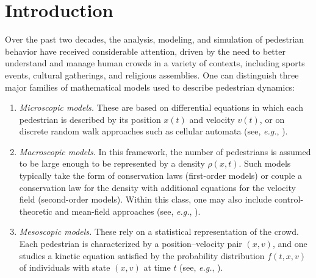\documentclass[final,reqno]{amsart}
\theoremstyle{plain}
\theoremstyle{definition}
\theoremstyle{remark}
\numberwithin{remark}{section}	%
\numberwithin{example}{section}	%
\begin{document}

\allowdisplaybreaks	%
\acresetall	%

\maketitle

\setcounter{tocdepth}{1}


\section{Introduction}\label{sec:intro}
Over the past two decades, the analysis, modeling, and simulation of pedestrian behavior have received considerable attention, driven by the need to better understand and manage human crowds in a variety of contexts, including sports events, cultural gatherings, and religious assemblies. One can distinguish three major families of mathematical models used to describe pedestrian dynamics:

\begin{enumerate}

\item {\textit{Microscopic models.}} These are based on differential equations in which each pedestrian is described by its position $x(t)$ and velocity $v(t)$, or on discrete random walk approaches such as cellular automata (see, \textit{e.g.}, \cite{Maury&Venel, maury2007modele, blue2000modeling, blue1998emergent, BURSTEDDE2001507}).

\item {\textit{Macroscopic models.}} In this framework, the number of pedestrians is assumed to be large enough to be represented by a density $\rho(x,t)$. Such models typically take the form of conservation laws (first-order models) or couple a conservation law for the density with additional equations for the velocity field (second-order models). Within this class, one may also include control-theoretic and mean-field approaches (see, \textit{e.g.}, \cite{SLHughs, Hughs2DSIM, Silvasim, carrillo2016improved, AMADORI2012259, Hughs2, Hughs33, Hughes2002, Hughes2003,gibelli2024macroscopic, Herzog&al}).

\item {\textit{Mesoscopic models.}} These rely on a statistical representation of the crowd. Each pedestrian is characterized by a position–velocity pair $(x,v)$, and one studies a kinetic equation satisfied by the probability distribution $f(t,x,v)$ of individuals with state $(x,v)$ at time $t$ (see, \textit{e.g.}, \cite{degond2013vision, henderson1974fluid, dogbe2012modelling, fermo2013fully, bellomo2013microscale, MRS1, MRSV}).
\end{enumerate}
\end{document}
